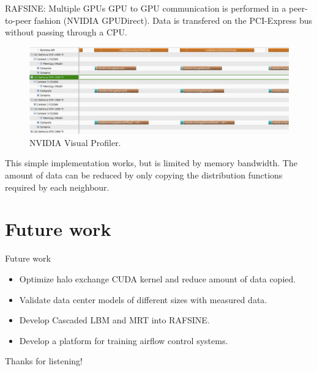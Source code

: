 \documentclass{beamer}
\begin{document}
\begin{frame}{RAFSINE: Multiple GPUs}
GPU to GPU communication is performed in a peer-to-peer fashion (NVIDIA GPUDirect). Data is transfered on the PCI-Express bus without passing through a CPU.
\begin{figure}[ht]
\begin{center}
\includegraphics[width=1\linewidth]{nvvp.png}
\end{center}
\caption{NVIDIA Visual Profiler.}
\label{fig:problem2}
\end{figure}
This simple implementation works, but is limited by memory bandwidth. The amount of data can be reduced by only copying the distribution functions required by each neighbour.
\end{frame}

\section{Future work}
\begin{frame}{Future work}
\begin{itemize}
\item Optimize halo exchange CUDA kernel and reduce amount of data copied.
\item Validate data center models of different sizes with measured data.
\item Develop Cascaded LBM and MRT into RAFSINE.
\item Develop a platform for training airflow control systems.
\end{itemize}
\end{frame}

\begin{frame}{Thanks for listening!}

\end{frame}
\end{document}
